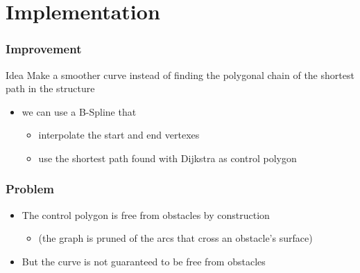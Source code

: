 \section{Implementation}

\begin{frame}
  \frametitle{Improvement}
  \begin{block}{Idea}
    Make a \alert{smoother} curve instead of finding the polygonal chain
    of the shortest path in the structure
  \end{block}
  \pause
  \begin{itemize}
  \item we can use a \alert{B-Spline} that \pause
    \begin{itemize}
    \item \alert{interpolate} the start and end vertexes\pause
    \item use the shortest path found with
      Dijkstra as \alert{control polygon}
    \end{itemize}
  \end{itemize}
\end{frame}

\begin{frame}
  \frametitle{Problem}  
  \begin{itemize}
  \item The \alert{control polygon} is free from obstacles by
    construction\pause
    \begin{itemize}
    \item (the graph is pruned of the arcs that cross an obstacle's surface)\pause
    \end{itemize}
  \item But the \alert{curve} is not guaranteed to be free from obstacles\pause
  \end{itemize}
  \begin{center}
  \end{center}
\end{frame}

